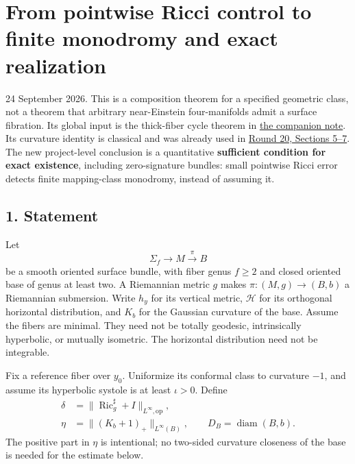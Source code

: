\documentclass[
  11pt,
]{article}
\author{}
\date{}
\begin{document}
\hypertarget{from-pointwise-ricci-control-to-finite-monodromy-and-exact-realization}{%
\section{From pointwise Ricci control to finite monodromy and exact
realization}\label{from-pointwise-ricci-control-to-finite-monodromy-and-exact-realization}}

24 September 2026. This is a composition theorem for a specified
geometric class, not a theorem that arbitrary near-Einstein
four-manifolds admit a surface fibration. Its global input is the
thick-fiber cycle theorem in
\href{20260924_cycle_holonomy_realization.md}{the companion note}. Its
curvature identity is classical and was already used in
\href{../mathematics/current/round20_construction.md}{Round 20, Sections
5--7}. The new project-level conclusion is a quantitative
\textbf{sufficient condition for exact existence}, including
zero-signature bundles: small pointwise Ricci error detects finite
mapping-class monodromy, instead of assuming it.

\hypertarget{statement}{%
\subsection{1. Statement}\label{statement}}

Let \[
        \Sigma_f\longrightarrow M\xrightarrow{\pi}B
\] be a smooth oriented surface bundle, with fiber genus \(f\ge2\) and
closed oriented base of genus at least two. A Riemannian metric \(g\)
makes \(\pi:(M,g)\to(B,b)\) a Riemannian submersion. Write \(h_y\) for
its vertical metric, \(\mathcal H\) for its orthogonal horizontal
distribution, and \(K_b\) for the Gaussian curvature of the base. Assume
the fibers are minimal. They need not be totally geodesic, intrinsically
hyperbolic, or mutually isometric. The horizontal distribution need not
be integrable.

Fix a reference fiber over \(y_0\). Uniformize its conformal class to
curvature \(-1\), and assume its hyperbolic systole is at least
\(\iota>0\). Define \[
\begin{split}
 \delta&=\|\operatorname{Ric}_g^{\sharp}+I\|_{L^\infty,\mathrm{op}},\\
 \eta&=\|(K_b+1)_+\|_{L^\infty(B)},\qquad
 D_B=\operatorname{diam}(B,b).
\end{split}                                                    \tag{1}
\] The positive part in \(\eta\) is intentional; no two-sided curvature
closeness of the base is needed for the estimate below.
\end{document}

